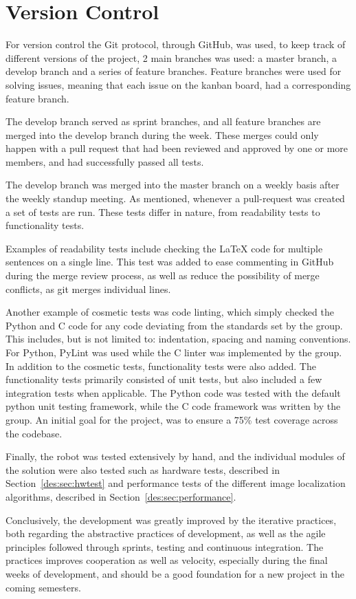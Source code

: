 \section{Version Control}
For version control the Git protocol, through GitHub, was used, to keep track of different versions of the project, 2 main branches was used: a master branch, a develop branch and a series of feature branches.
Feature branches were used for solving issues, meaning that each issue on the kanban board, had a corresponding feature branch.

The develop branch served as sprint branches, and all feature branches are merged into the develop branch during the week.
These merges could only happen with a pull request that had been reviewed and approved by one or more members, and had successfully passed all tests.

The develop branch was merged into the master branch on a weekly basis after the weekly standup meeting.
As mentioned, whenever a pull-request was created a set of tests are run. 
These tests differ in nature, from readability tests to functionality tests.

Examples of readability tests include checking the LaTeX code for multiple sentences on a single line.
This test was added to ease commenting in GitHub during the merge review process, as well as reduce the possibility of merge conflicts, as git merges individual lines.

Another example of cosmetic tests was code linting, which simply checked the Python and C code for any code deviating from the standards set by the group.
This includes, but is not limited to: indentation, spacing and naming conventions.
For Python, PyLint was used while the C linter was implemented by the group.
In addition to the cosmetic tests, functionality tests were also added.
The functionality tests primarily consisted of unit tests, but also included a few integration tests when applicable.
The Python code was tested with the default python unit testing framework, while the C code framework was written by the group.
An initial goal for the project, was to ensure a 75\% test coverage across the codebase.

Finally, the robot was tested extensively by hand, and the individual modules of the solution were also tested such as hardware tests, described in Section~\ref{des:sec:hwtest} and performance tests of the different image localization algorithms, described in Section~\ref{des:sec:performance}.

Conclusively, the development was greatly improved by the iterative practices, both regarding the abstractive practices of development, as well as the agile principles followed through sprints, testing and continuous integration.
The practices improves cooperation as well as velocity, especially during the final weeks of development, and should be a good foundation for a new project in the coming semesters.
